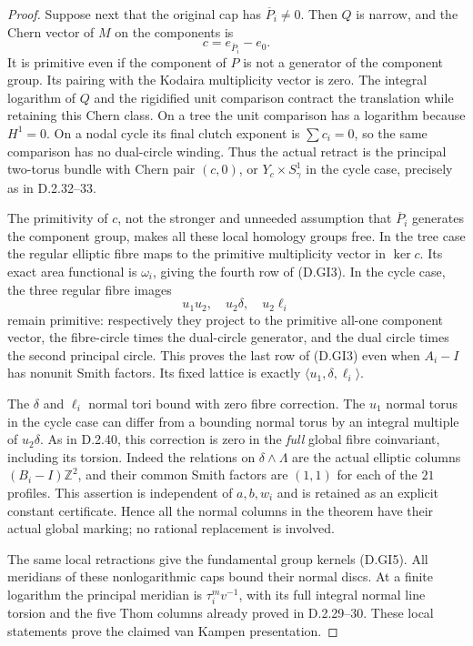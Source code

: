 \begin{proof}
Suppose next that the original cap has
$\overline P_i\ne0$. Then $Q$ is narrow, and the
Chern vector of $M$ on the components is
\[
                         c=e_{\overline P_i}-e_0.
\]
It is primitive even if the component of $P$
is not a generator of the component group.
Its pairing with the Kodaira multiplicity vector
is zero. The integral logarithm of $Q$ and the
rigidified unit comparison contract the translation
while retaining this Chern class. On a tree the
unit comparison has a logarithm because $H^1=0$.
On a nodal cycle its final clutch exponent is
$\sum c_i=0$, so the same comparison has no
dual-circle winding. Thus the actual retract is
the principal two-torus bundle with Chern pair
$(c,0)$, or $Y_c\times S^1_\gamma$ in the cycle
case, precisely as in D.2.32--33.

The primitivity of $c$, not the stronger and
unneeded assumption that $\overline P_i$ generates
the component group, makes all these local homology
groups free. In the tree case the regular elliptic
fibre maps to the primitive multiplicity vector in
$\ker c$. Its exact area functional is $\omega_i$,
giving the fourth row of (D.GI3). In the cycle case,
the three regular fibre images
\[
                       u_1u_2,\quad u_2\delta,\quad u_2\ell_i
\]
remain primitive: respectively they project to the
primitive all-one component vector, the fibre-circle
times the dual-circle generator, and the dual circle
times the second principal circle. This proves the
last row of (D.GI3) even when $A_i-I$ has nonunit
Smith factors. Its fixed lattice is exactly
$\langle u_1,\delta,\ell_i\rangle$.

The $\delta$ and $\ell_i$ normal tori bound with
zero fibre correction. The $u_1$ normal torus in
the cycle case can differ from a bounding normal
torus by an integral multiple of $u_2\delta$.
As in D.2.40, this correction is zero in the
\emph{full} global fibre coinvariant, including its
torsion. Indeed the relations on $\delta\wedge\Lambda$
are the actual elliptic columns $(B_i-I)\mathbb Z^2$,
and their common Smith factors are $(1,1)$ for
each of the $21$ profiles. This assertion is
independent of $a,b,w_i$ and is retained as an
explicit constant certificate. Hence all the normal
columns in the theorem have their actual global
marking; no rational replacement is involved.

The same local retractions give the fundamental
group kernels (D.GI5). All meridians of these
nonlogarithmic caps bound their normal discs.
At a finite logarithm the principal meridian is
$\tau_i^m v^{-1}$, with its full integral normal
line torsion and the five Thom columns already
proved in D.2.29--30. These local statements prove
the claimed van Kampen presentation.


\end{proof}
